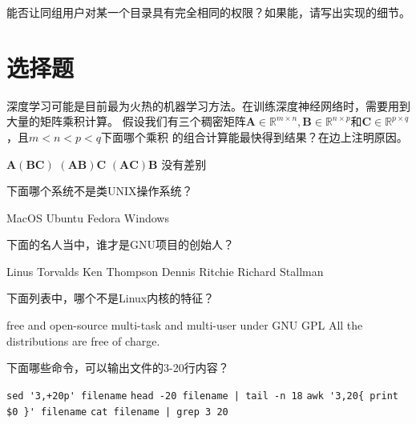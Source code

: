 \documentclass[addpoints,12pt,answers]{exam}
\begin{document}
\begin{CJK*}{UTF8}{gbsn}
\begin{questions}
\question[10]
能否让同组用户对某一个目录具有完全相同的权限？如果能，请写出实现的细节。
\begin{solution}
\vspace{1in}
\end{solution}

\end{questions}

\newpage

\section{选择题}

\begin{questions}
\question[2]
深度学习可能是目前最为火热的机器学习方法。在训练深度神经网络时，需要用到大量的矩阵乘积计算。
假设我们有三个稠密矩阵$\mathbf{A} \in \mathbb{R}^{m \times n}, \mathbf{B} \in \mathbb{R}^{n 
\times p}$和$\mathbf{C} \in \mathbb{R}^{p \times q}$，且$m < n < p < q$下面哪个乘积
的组合计算能最快得到结果？在边上注明原因。
\begin{choices}
\choice $\mathbf{A(BC)}$
\choice $\mathbf{(AB)C}$
\choice $\mathbf{(AC)B}$
\choice 没有差别
\end{choices}
\answerline

\question[2]
下面哪个系统不是类UNIX操作系统？
\begin{choices}
\choice MacOS
\choice Ubuntu
\choice Fedora
\choice Windows
\end{choices}
\answerline

\question[2]
下面的名人当中，谁才是GNU项目的创始人？
\begin{choices}
\choice Linus Torvalds
\choice Ken Thompson
\choice Dennis Ritchie
\choice Richard Stallman
\end{choices}
\answerline

\question[2]
下面列表中，哪个不是Linux内核的特征？
\begin{choices}
	\choice free and open-source
	\choice	multi-task and multi-user
	\choice under GNU GPL
	\choice All the distributions are free of charge.
\end{choices}
\answerline

\question[2]
下面哪些命令，可以输出文件的3-20行内容？
\begin{choices}
	\choice \lstinline{sed '3,+20p' filename}
	\choice \lstinline{head -20 filename | tail -n 18}
	\choice \lstinline!awk '3,20{ print $0 }' filename!
	\choice \lstinline{cat filename | grep 3 20}
\end{choices}
\answerline


\end{questions}
\end{CJK*}
\end{document}
